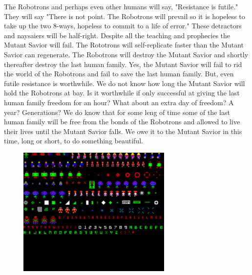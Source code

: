 \documentclass{amsbook}
\begin{document}
The Robotrons and perhaps even other humans will say, "Resistance is
futile." They will say "There is not point. The Robotrons will prevail
so it is hopeless to take up the two 8-ways, hopeless to commit to a
life of error." These detractors and naysaiers will be half-right.
Despite all the teaching and prophecies the Mutant Savior will fail.
The Rototrons will self-replicate faster than the Mutant Savior can
regenerate. The Robotrons will destroy the Mutant Savior and shortly
thereafter destroy the last human family. Yes, the Mutant Savior will
fail to rid the world of the Robotrons and fail to  save the last
human family. But, even futile resistance is worthwhile. We do not
know how long the Mutant Savior will hold the Robotrons at bay. Is it
worthwhile if only successful at giving the last human family freedom
for an hour? What about an extra day of freedom? A year? Generations?
We do know that for some leng of time some of the last human family
will be free from the bonds of the Robotrons and allowed to live their
lives until the Mutant Savior falls. We owe it to the Mutant Savior in
this time, long or short, to do something beautiful.

\begin{figure}[h]
  \includegraphics[width=3in]{robotronsprites.jpg}
\end{figure}
\end{document}
